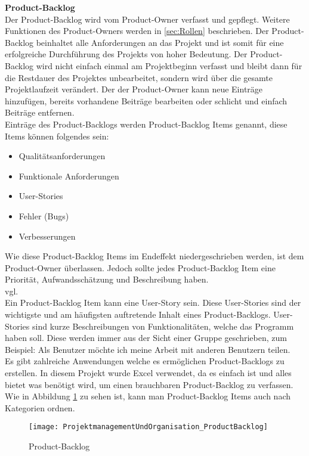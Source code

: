 			\textbf{Product-Backlog} \\
				Der Product-Backlog wird vom Product-Owner verfasst und gepflegt. Weitere Funktionen des Product-Owners werden in \ref{sec:Rollen} beschrieben. Der Product-Backlog beinhaltet alle Anforderungen an das Projekt und ist somit für eine erfolgreiche Durchführung des Projekts von hoher Bedeutung. Der Product-Backlog wird nicht einfach einmal am Projektbeginn verfasst und bleibt dann für die Restdauer des Projektes unbearbeitet, sondern wird über die gesamte Projektlaufzeit verändert. Der der Product-Owner kann neue Einträge hinzufügen, bereits vorhandene Beiträge bearbeiten oder schlicht und einfach Beiträge entfernen. \\
				Einträge des Product-Backlogs werden Product-Backlog Items genannt, diese Items können folgendes sein: 
				\begin{itemize}
					\item Qualitätsanforderungen
					\item Funktionale Anforderungen
					\item User-Stories
					\item Fehler (Bugs)
					\item Verbesserungen
				\end{itemize}
				Wie diese Product-Backlog Items im Endeffekt niedergeschrieben werden, ist dem Product-Owner überlassen. Jedoch sollte jedes Product-Backlog Item eine Priorität, Aufwandsschätzung und Beschreibung haben.\\ vgl.\textcite{ScrumProduct-Backlog} \\
				Ein Product-Backlog Item kann eine User-Story sein. Diese User-Stories sind der wichtigste und am häufigsten auftretende Inhalt eines Product-Backlogs. User-Stories sind kurze Beschreibungen von Funktionalitäten, welche das Programm haben soll. Diese werden immer aus der Sicht einer Gruppe geschrieben, zum Beispiel: Als Benutzer möchte ich meine Arbeit mit anderen Benutzern teilen. \\
				Es gibt zahlreiche Anwendungen welche es ermöglichen Product-Backlogs zu erstellen. In diesem Projekt wurde Excel verwendet, da es einfach ist und alles bietet was benötigt wird, um einen brauchbaren Product-Backlog zu verfassen. Wie in Abbildung \ref{fig:productBacklog} zu sehen ist, kann man Product-Backlog Items auch nach Kategorien ordnen. \\
\begin{figure}[H]	
	\texttt{[image: ProjektmanagementUndOrganisation\_ProductBacklog]}
    \caption{Product-Backlog}
    \label{fig:productBacklog}
\end{figure}
				
